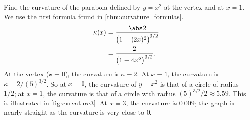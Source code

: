 \begin{example}\label{ex_curvature3}
Find the curvature of the parabola defined by $y=x^2$ at the vertex and at $x=1$.
\solution
We use the first formula found in \autoref{thm:curvature_formulas}. 
\begin{align*}
\kappa(x) &= \frac{\abs 2}{\bigl(1+(2x)^2\bigr)^{3/2}} \\
			&= \frac2{\bigl(1+4x^2\bigr)^{3/2}}.
\end{align*}
At the vertex ($x=0$), the curvature is $\kappa = 2$. At $x=1$, the curvature is $\kappa = 2/(5)^{3/2}$. So at $x=0$, the curvature of $y=x^2$ is that of a circle of radius $1/2$; at $x=1$, the curvature is that of a circle with radius $(5)^{3/2}/2\approx 5.59$. This is illustrated in \autoref{fig:curvature3}. At $x=3$, the curvature is $0.009$; the graph is nearly straight as the curvature is very close to 0.
\end{example}

